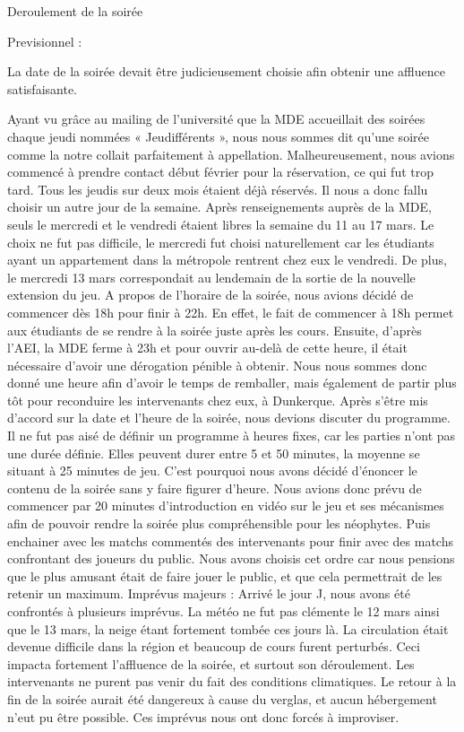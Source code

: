 ﻿ Deroulement de la soirée 

Previsionnel :

La date de la soirée devait être judicieusement choisie afin obtenir une affluence satisfaisante.

Ayant vu grâce au mailing de l’université que la MDE accueillait des soirées chaque jeudi 
nommées « Jeudifférents », nous nous sommes dit qu’une soirée comme la notre collait 
parfaitement à appellation. Malheureusement, nous avions commencé à prendre contact 
début février pour la réservation, ce qui fut trop tard. Tous les jeudis sur deux mois étaient 
déjà réservés.
Il nous a donc fallu choisir un autre jour de la semaine. Après renseignements auprès de la 
MDE, seuls le mercredi et le vendredi étaient libres la semaine du 11 au 17 mars. Le choix ne 
fut pas difficile, le mercredi fut choisi naturellement car les étudiants ayant un appartement 
dans la métropole rentrent chez eux le vendredi. De plus, le mercredi 13 mars correspondait 
au lendemain de la sortie de la nouvelle extension du jeu.
A propos de l’horaire de la soirée, nous avions décidé de commencer dès 18h pour finir à 
22h. En effet, le fait de commencer à 18h permet aux étudiants de se rendre à la soirée juste 
après les cours. Ensuite, d’après l’AEI, la MDE ferme à 23h et pour ouvrir au-delà de cette 
heure, il était nécessaire d’avoir une dérogation pénible à obtenir. Nous nous sommes donc 
donné une heure afin d’avoir le temps de remballer, mais également de partir plus tôt pour 
reconduire les intervenants chez eux, à Dunkerque.
Après s’être mis d’accord sur la date et l’heure de la soirée, nous devions discuter du 
programme.
Il ne fut pas aisé de définir un programme à heures fixes, car les parties n’ont pas une durée 
définie. Elles peuvent durer entre 5 et 50 minutes, la moyenne se situant à 25 minutes de jeu. 
C’est pourquoi nous avons décidé d’énoncer le contenu de la soirée sans y faire figurer 
d’heure.
Nous avions donc prévu de commencer par 20 minutes d’introduction en vidéo sur le jeu et 
ses mécanismes afin de pouvoir rendre la soirée plus compréhensible pour les néophytes. 
Puis enchainer avec les matchs commentés des intervenants pour finir avec des matchs 
confrontant des joueurs du public. Nous avons choisis cet ordre car nous pensions que le plus 
amusant était de faire jouer le public, et que cela permettrait de les retenir un maximum.
Imprévus majeurs :
Arrivé le jour J, nous avons été confrontés à plusieurs imprévus.
La météo ne fut pas clémente le 12 mars ainsi que le 13 mars, la neige étant fortement 
tombée ces jours là. La circulation était devenue difficile dans la région et beaucoup de cours 
furent perturbés.
Ceci impacta fortement l’affluence de la soirée, et surtout son déroulement. Les intervenants 
ne purent pas venir du fait des conditions climatiques. Le retour à la fin de la soirée aurait été 
dangereux à cause du verglas, et aucun hébergement n’eut pu être possible.
Ces imprévus nous ont donc forcés à improviser.

